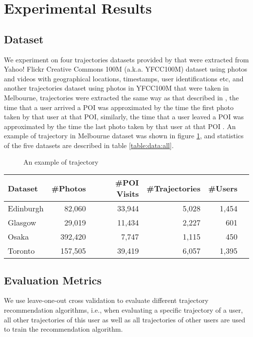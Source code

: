 \section{Experimental Results}
\label{experiment}

\subsection{Dataset}
\label{experiment:dataset}
We experiment on four trajectories datasets provided by \cite{ijcai15} that were
extracted from Yahoo! Flickr Creative Commons 100M (a.k.a. YFCC100M) dataset\cite{yfcc100m} 
using photos and videos with geographical locations, timestamps, user identifications etc,
and another trajectories dataset using photos in YFCC100M that were taken in Melbourne,
trajectories were extracted the same way as that described in \cite{ht10, ijcai15},
the time that a user arrived a POI was approximated by the time the first photo taken by that user at that POI,
similarly, the time that a user leaved a POI was approximated by the time the last photo taken by that user at 
that POI \cite{ijcai15}.
An example of trajectory in Melbourne dataset was shown in figure \ref{fig:traj}, 
and statistics of the five datasets are described in table \ref{table:data:all}.


\begin{figure}
\centering
{}
\caption{An example of trajectory}
\label{fig:traj}
\end{figure}

\begin{table*}
\centering
\caption{Datasets description}
\label{table:data:all}
\begin{tabular}{lrrrrr} \hline
\textbf{Dataset} & \textbf{\#Photos} & \textbf{\#POI Visits} & \textbf{\#Trajectories} & \textbf{\#Users} \\ \hline
Edinburgh & 82,060 & 33,944 & 5,028 & 1,454 \\ 
Glasgow & 29,019 & 11,434 & 2,227 & 601 \\ 
Osaka & 392,420 & 7,747 & 1,115 & 450 \\ 
Toronto & 157,505 & 39,419 & 6,057 & 1,395 \\ 
\hline
\end{tabular}
\end{table*}


\subsection{Evaluation Metrics}
\label{experiment:metric}
We use leave-one-out cross validation to evaluate different trajectory recommendation algorithms,
i.e., when evaluating a specific trajectory of a user, all other trajectories of this user as well as 
all trajectories of other users are used to train the recommendation algorithm.

